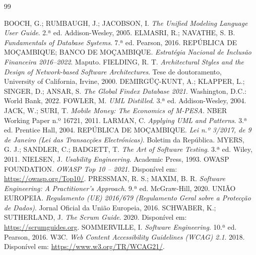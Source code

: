 \documentclass[12pt,a4paper,openany]{report}
\begin{document}
\begin{thebibliography}{99}
\renewcommand{\bibname}{Bibliografia}
 BOOCH, G.; RUMBAUGH, J.; JACOBSON, I. \emph{The Unified Modeling Language User Guide}. 2.ª ed. Addison-Wesley, 2005.
 ELMASRI, R.; NAVATHE, S. B. \emph{Fundamentals of Database Systems}. 7.ª ed. Pearson, 2016.
 REPÚBLICA DE MOÇAMBIQUE; BANCO DE MOÇAMBIQUE. \emph{Estratégia Nacional de Inclusão Financeira 2016--2022}. Maputo.
 FIELDING, R. T. \emph{Architectural Styles and the Design of Network-based Software Architectures}. Tese de doutoramento, University of California, Irvine, 2000.
 DEMIRGÜÇ-KUNT, A.; KLAPPER, L.; SINGER, D.; ANSAR, S. \emph{The Global Findex Database 2021}. Washington, D.C.: World Bank, 2022.
 FOWLER, M. \emph{UML Distilled}. 3.ª ed. Addison-Wesley, 2004.
 JACK, W.; SURI, T. \emph{Mobile Money: The Economics of M-PESA}. NBER Working Paper n.º 16721, 2011.
 LARMAN, C. \emph{Applying UML and Patterns}. 3.ª ed. Prentice Hall, 2004.
 REPÚBLICA DE MOÇAMBIQUE. \emph{Lei n.º 3/2017, de 9 de Janeiro (Lei das Transacções Electrónicas)}. Boletim da República.
 MYERS, G. J.; SANDLER, C.; BADGETT, T. \emph{The Art of Software Testing}. 3.ª ed. Wiley, 2011.
 NIELSEN, J. \emph{Usability Engineering}. Academic Press, 1993.
 OWASP FOUNDATION. \emph{OWASP Top 10 -- 2021}. Disponível em: \url{https://owasp.org/Top10/}.
 PRESSMAN, R. S.; MAXIM, B. R. \emph{Software Engineering: A Practitioner's Approach}. 9.ª ed. McGraw-Hill, 2020.
 UNIÃO EUROPEIA. \emph{Regulamento (UE) 2016/679 (Regulamento Geral sobre a Protecção de Dados)}. Jornal Oficial da União Europeia, 2016.
 SCHWABER, K.; SUTHERLAND, J. \emph{The Scrum Guide}. 2020. Disponível em: \url{https://scrumguides.org}.
 SOMMERVILLE, I. \emph{Software Engineering}. 10.ª ed. Pearson, 2016.
 W3C. \emph{Web Content Accessibility Guidelines (WCAG) 2.1}. 2018. Disponível em: \url{https://www.w3.org/TR/WCAG21/}.
\end{thebibliography}

\appendix
\renewcommand{\thechapter}{\Alph{chapter}}
\end{document}

